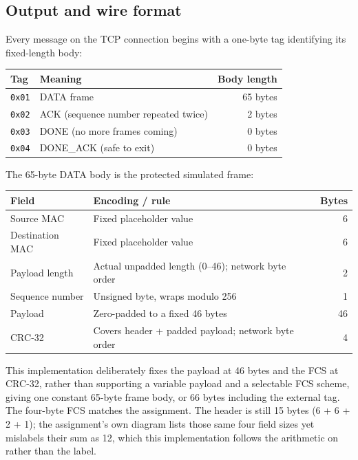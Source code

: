 \documentclass[11pt]{article}
\begin{document}
\subsection{Output and wire format}
Every message on the TCP connection begins with a one-byte tag identifying its fixed-length body:

\begin{center}
    \begin{tabular}{llr}
        \toprule
        Tag           & Meaning                              & Body length \\
        \midrule
        \texttt{0x01} & DATA frame                           & 65 bytes    \\
        \texttt{0x02} & ACK (sequence number repeated twice) & 2 bytes     \\
        \texttt{0x03} & DONE (no more frames coming)         & 0 bytes     \\
        \texttt{0x04} & DONE\_ACK (safe to exit)             & 0 bytes     \\
        \bottomrule
    \end{tabular}
\end{center}

The 65-byte DATA body is the protected simulated frame:

\begin{center}
    \begin{tabular}{llr}
        \toprule
        Field           & Encoding / rule                                    & Bytes \\
        \midrule
        Source MAC      & Fixed placeholder value                            & 6     \\
        Destination MAC & Fixed placeholder value                            & 6     \\
        Payload length  & Actual unpadded length (0--46); network byte order & 2     \\
        Sequence number & Unsigned byte, wraps modulo 256                    & 1     \\
        Payload         & Zero-padded to a fixed 46 bytes                    & 46    \\
        CRC-32          & Covers header + padded payload; network byte order & 4     \\
        \bottomrule
    \end{tabular}
\end{center}

This implementation deliberately fixes the payload at 46 bytes and the FCS at CRC-32, rather than
supporting a variable payload and a selectable FCS scheme, giving one constant 65-byte frame
body, or 66 bytes including the external tag. The four-byte FCS matches the assignment.
The header is still 15 bytes (6 + 6 + 2 + 1);
the assignment's own diagram lists those same four field sizes yet mislabels their sum as 12, which
this implementation follows the arithmetic on rather than the label.
\end{document}
